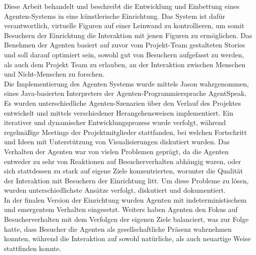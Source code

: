 \documentclass[draft,final]{vutinfth} %
\begin{document}
\begin{kurzfassung}

Diese Arbeit behandelt und beschreibt die Entwicklung und Einbettung eines Agenten-Systems in eine künstlerische Einrichtung. 
Das System ist dafür verantwortlich, virtuelle Figuren auf einer Leinwand zu kontrollieren, um somit Besuchern der Einrichtung die Interaktion mit jenen Figuren zu ermöglichen. 
Das Benehmen der Agenten basiert auf zuvor vom Projekt-Team gestalteten Stories und soll darauf optimiert sein, sowohl gut von Besuchern aufgefasst zu werden, als auch dem Projekt Team zu erlauben, an der Interaktion zwischen Menschen und Nicht-Menschen zu forschen. \\
Die Implementierung des Agenten Systems wurde mittels Jason wahrgenommen, eines Java-basierten Interpreters der Agenten-Programmiersprache AgentSpeak. 
Es wurden unterschiedliche Agenten-Szenarien über den Verlauf des Projektes entwickelt und mittels verschiedener Herangehensweisen implementiert. 
Ein iterativer und dynamischer Entwicklungsprozess wurde verfolgt, während regelmäßige Meetings der Projektmitglieder stattfanden, bei welchen Fortschritt und Ideen mit Unterstützung von Visualisierungen diskutiert wurden. 
Das Verhalten der Agenten war von vielen Problemen geprägt, da die Agenten entweder zu sehr von Reaktionen auf Besucherverhalten abhängig waren, oder sich stattdessen zu stark auf eigene Ziele konzentrierten, worunter die Qualität der Interaktion mit Besuchern der Einrichtung litt. 
Um diese Probleme zu lösen, wurden unterschiedlichste Ansätze verfolgt, diskutiert und dokumentiert.\\
In der finalen Version der Einrichtung wurden Agenten mit indeterministischem und emergentem Verhalten eingesetzt. 
Weiters haben Agenten den Fokus auf Besucherverhalten mit dem Verfolgen der eigenen Ziele balanciert, was zur Folge hatte, dass Besucher die Agenten als gesellschaftliche Präsenz wahrnehmen konnten, während die Interaktion auf sowohl natürliche, als auch neuartige Weise stattfinden konnte.

\end{kurzfassung}
\end{document}
